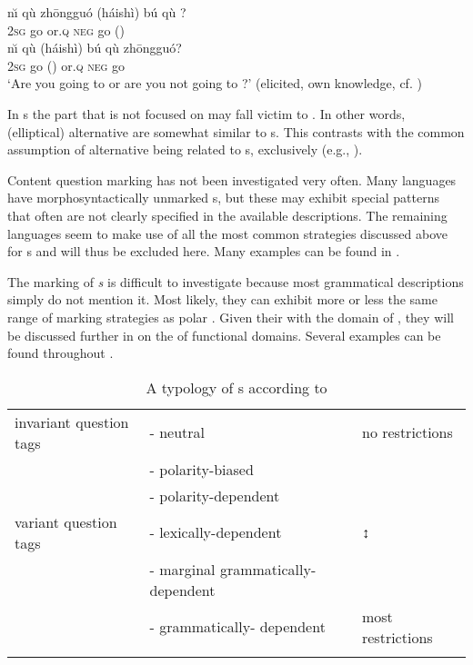     \ex
    \gll n\u{\i}  qù  zh\=ongguó  (háishì)  bú   qù  {\longrule}  ?\\
    2\textsc{sg}  go      or.\textsc{q}    \textsc{neg}  go  ()\\

    \ex
    \gll n\u{\i}  qù  {\longrule}    (háishì)  bú   qù  zh\=ongguó?\\
    2\textsc{sg}  go  ()  or.\textsc{q}    \textsc{neg}  go  \\
    \glt ‘Are you going to  or are you not going to ?’ (elicited, own knowledge, cf. \citealt{Hölzl2015b})
    \z
    \z 

\noindent In s the part that is not focused on may fall victim to . In other words, (elliptical) alternative  are somewhat similar to s. This contrasts with the common assumption of alternative  being related to s, exclusively (e.g., \citealt{Siemund2001}).

Content question marking has not been investigated very often. Many languages have morphosyntactically unmarked s, but these may exhibit special  patterns that often are not clearly specified in the available descriptions. The remaining languages seem to make use of all the most common  strategies discussed above for s and will thus be excluded here. Many examples can be found in .

The marking of \textit{s} is difficult to investigate because most grammatical descriptions simply do not mention it. Most likely, they can exhibit more or less the same range of marking strategies as polar . Given their  with the domain of , they will be discussed further in  on the  of functional domains. Several examples can be found throughout .

\begin{table}
\caption{A typology of s according to \citet[803]{Axelsson2011}}
\label{tab:4:5}
\begin{tabularx}{\textwidth}{lQl}
\lsptoprule
invariant question tags & - neutral & no restrictions\\
& - polarity-biased &\\
& - polarity-dependent & \\
\tablevspace
\tablevspace
variant question tags & - lexically-dependent & ↕\\
& - marginal grammatically- dependent & \\
& - grammatically- dependent & most restrictions\\
\lspbottomrule
\end{tabularx}
\end{table}

